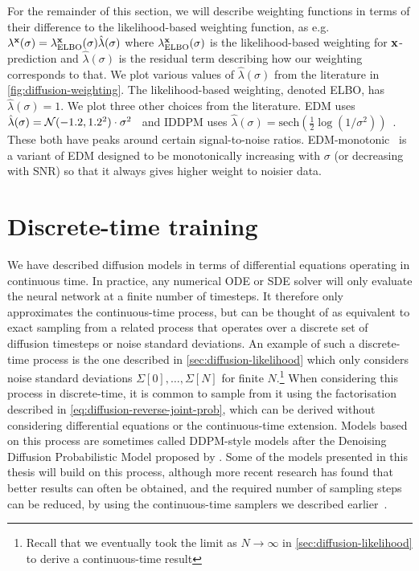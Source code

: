 For the remainder of this section, we will describe weighting functions in terms of their difference to the likelihood-based weighting function, as e.g. $\lambda^{\mathbf{x}}(\sigma) = \lambda^{\mathbf{x}}_\text{ELBO}(\sigma) \hat{\lambda}(\sigma)$ where $\lambda^{\mathbf{x}}_\text{ELBO}(\sigma)$ is the likelihood-based weighting for ${\mathbf{x}}$-prediction and $\hat{\lambda}(\sigma)$ is the residual term describing how our weighting corresponds to that. We plot various values of $\hat{\lambda}(\sigma)$ from the literature in \cref{fig:diffusion-weighting}. The likelihood-based weighting, denoted ELBO, has $\hat{\lambda}(\sigma) = 1$. We plot three other choices from the literature. EDM uses $\hat{\lambda}(\sigma) = {\mathcal{N}}(-1.2, 1.2^2) \cdot \sigma^2$~\citep{karras2022elucidating,kingma2023understanding} and IDDPM uses $\hat{\lambda}(\sigma) = \text{sech}(\frac{1}{2} \log(1/\sigma^2) )$~\citep{nichol2021improved,kingma2023understanding}. These both have peaks around certain signal-to-noise ratios. EDM-monotonic~\citep{kingma2023understanding} is a variant of EDM designed to be monotonically increasing with $\sigma$ (or decreasing with SNR) so that it always gives higher weight to noisier data.


\section{Discrete-time training}
We have described diffusion models in terms of differential equations operating in continuous time. In practice, any numerical ODE or SDE solver will only evaluate the neural network at a finite number of timesteps. It therefore only approximates the continuous-time process, but can be thought of as equivalent to exact sampling from a related process that operates over a discrete set of diffusion timesteps or noise standard deviations. An example of such a discrete-time process is the one described in \cref{sec:diffusion-likelihood} which only considers noise standard deviations $\Sigma[0], \ldots, \Sigma[N]$ for finite $N$.\footnote{Recall that we eventually took the limit as $N \rightarrow \infty$ in \cref{sec:diffusion-likelihood} to derive a continuous-time result} When considering this process in discrete-time, it is common to sample from it using the factorisation described in \cref{eq:diffusion-reverse-joint-prob}, which can be derived without considering differential equations or the continuous-time extension. Models based on this process are sometimes called DDPM-style models after the Denoising Diffusion Probabilistic Model proposed by \citet{ho2020denoising}. Some of the models presented in this thesis will build on this process, although more recent research has found that better results can often be obtained, and the required number of sampling steps can be reduced, by using the continuous-time samplers we described earlier~\citep{karras2022elucidating}. 

